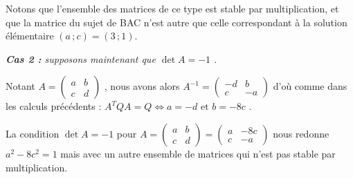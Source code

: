 \medskip

Notons que l'ensemble des matrices de ce type est stable par multiplication, et que la matrice du sujet de BAC n'est autre que celle correspondant à la solution élémentaire
$(a \,; c) = (3 \,; 1)$.




\bigskip

\textit{\textbf{Cas 2 :} supposons maintenant que $\det A = -1$ .}

\medskip

Notant
$A = \begin{pmatrix} 
  a & b \\ 
  c & d
\end{pmatrix}$ ,
nous avons alors
$A^{-1} = \begin{pmatrix} 
  -d & b  \\ 
   c & -a
\end{pmatrix}$
d'où comme dans les calculs précédents :
$A^T Q A = Q \Longleftrightarrow a = -d \text{ et } b = -8c$ .


\bigskip

La condition $\det A = -1$ pour
$A
=
\begin{pmatrix} 
  a & b \\ 
  c & d
\end{pmatrix}
=
\begin{pmatrix} 
  a & -8c \\ 
  c & -a
\end{pmatrix}$
nous redonne
$a^2 - 8c^2 = 1$ mais avec un autre ensemble de matrices qui n'est pas stable par multiplication.

